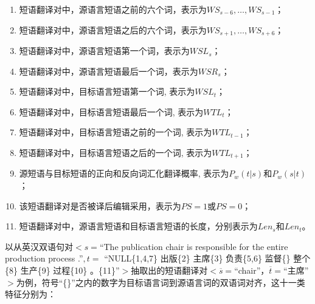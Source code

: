 \begin{enumerate}[(1)]
	\item 短语翻译对中，源语言短语之前的六个词，表示为$WS_{s-6},\ldots,WS_{s-1}$；
	
	\item 短语翻译对中，源语言短语之后的六个词，表示为$WS_{s+1},\ldots,WS_{s+6}$；
	
	\item 短语翻译对中，源语言短语第一个词，表示为$WSL_s$；
	
	\item 短语翻译对中，源语言短语最后一个词，表示为$WSR_s$；
	
	\item 短语翻译对中，目标语言短语第一个词, 表示为$WSL_t$；
	
	\item 短语翻译对中，目标语言短语最后一个词, 表示为$WTL_{t}$；
	
	\item 短语翻译对中，目标语言短语之前的一个词, 表示为$WTL_{t-1}$；
	
	\item 短语翻译对中，目标语言短语之后的一个词, 表示为$WTL_{t+1}$；
	
	\item 源短语与目标短语的正向和反向词汇化翻译概率, 表示为$P_w(t|s)$和$P_w(s|t)$；
	
	\item 该短语翻译对是否被译后编辑采用，表示为$PS=1$或$PS=0$；
	
	\item 短语翻译对中，源语言短语和目标语言短语的长度，分别表示为$Len_s $和$Len_t$。
\end{enumerate}

以从英汉双语句对$<s=$“The publication chair is responsible for the entire production process .”$,t=$ “NULL\{1,4,7\} 出版\{2\} 主席\{3\} 负责\{5,6\} 监督\{\} 整个\{8\} 生产\{9\} 过程\{10\} 。\{11\}”$>$抽取出的短语翻译对$<\overline{s}=$“chair”，$\overline{t}=$“主席”$>$为例，符号“\{\}”之内的数字为目标语言词到源语言词的双语词对齐，这十一类特征分别为：


